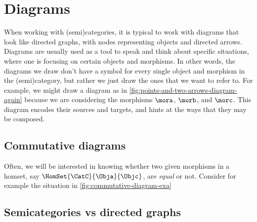 
\section{Diagrams}


When working with (semi)categories, it is typical to work with diagrams that look like directed graphs, with nodes representing objects and directed arrows. Diagrams are usually used as a tool to speak and think about specific situations, where one is focusing on certain objects and morphisms. In other words, the diagrams we draw don't have a symbol for every single object and morphism in the (semi)category, but rather we just draw the ones that we want to refer to. For example, we might draw a diagram as in \cref{fig:points-and-two-arrows-diagram-again} because we are considering the morphisms $\mora$, $\morb$, and $\morc$. This diagram encodes their sources and targets, and hints at the ways that they may be composed. 

\begin{marginfigure}
    \begin{center}
    \end{center}
    \caption{}
    \label{fig:points-and-three-arrows-diagram}
\end{marginfigure}

\subsection{Commutative diagrams}

Often, we will be interested in knowing whether two given morphisms in a homset, say $\HomSet{\CatC}{\Obja}{\Objc}$, are \emph{equal} or not. Consider for example the situation in \cref{fig:commutative-diagram-exa}

\begin{marginfigure}
    \centering
    \caption{}
    \label{fig:commutative-diagram-exa}
\end{marginfigure}




\subsection{Semicategories vs directed graphs}

